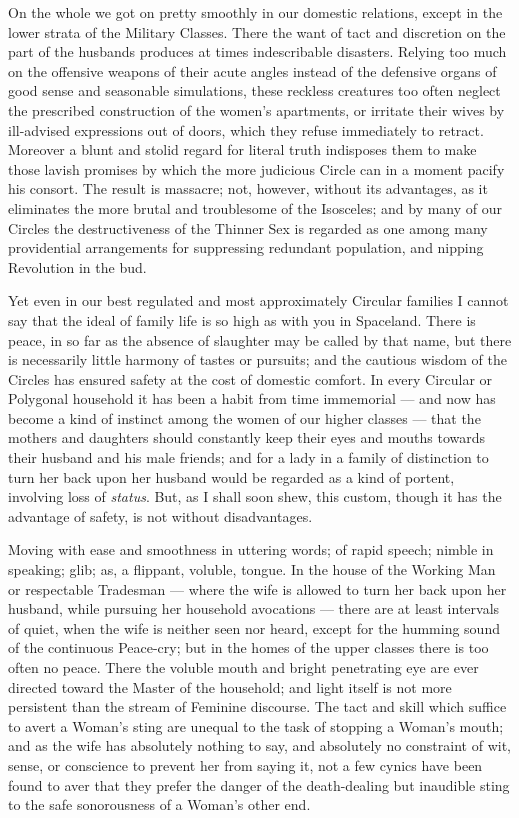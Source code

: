 \documentclass[10pt, kindle, oneside]{kindle}
\begin{document}
On the whole we got on pretty smoothly in our domestic
relations, except in the lower strata of the Military Classes. There the want
of tact and discretion on the part of the husbands produces at times
indescribable disasters. Relying too much on the offensive weapons of their
acute angles instead of the defensive organs of good sense and seasonable
simulations, these reckless creatures too often neglect the prescribed
construction of the women's apartments, or irritate their wives by ill-advised
expressions out of doors, which they refuse immediately to retract. Moreover a
blunt and stolid regard for literal truth indisposes them to make those lavish
promises by which the more judicious Circle can in a moment pacify his
consort. The result is massacre; not, however, without its advantages, as it
eliminates the more brutal and troublesome of the Isosceles; and by many of
our Circles the destructiveness of the Thinner Sex is regarded as one among
many providential arrangements for suppressing redundant population, and
nipping Revolution in the bud.

Yet even in our best regulated and most approximately Circular families I
cannot say that the ideal of family life is so high as with you in Spaceland.
There is peace, in so far as the absence of slaughter may be called by that
name, but there is necessarily little harmony of tastes or pursuits; and the
cautious wisdom of the Circles has ensured safety at the cost of domestic
comfort. In every Circular or Polygonal household it has been a habit from
time immemorial --- and now has become a kind of instinct among the women of our
higher classes --- that the mothers and daughters should constantly keep their
eyes and mouths towards their husband and his male friends; and for a lady in
a family of distinction to turn her back upon her husband would be regarded as
a kind of portent, involving loss of \emph{status}. But, as I shall soon shew, this
custom, though it has the advantage of safety, is not without disadvantages.

Moving with ease and smoothness in uttering words; of rapid speech;
nimble in speaking; glib; as, a flippant, voluble, tongue.  In the house of
the Working Man or respectable Tradesman --- where the wife is allowed to turn
her back upon her husband, while pursuing her household avocations --- there are
at least intervals of quiet, when the wife is neither seen nor heard, except
for the humming sound of the continuous Peace-cry; but in the homes of the
upper classes there is too often no peace. There the voluble mouth and bright
penetrating eye are ever directed toward the Master of the household; and
light itself is not more persistent than the stream of Feminine discourse. The
tact and skill which suffice to avert a Woman's sting are unequal to the task
of stopping a Woman's mouth; and as the wife has absolutely nothing to say,
and absolutely no constraint of wit, sense, or conscience to prevent her from
saying it, not a few cynics have been found to aver that they prefer the
danger of the death-dealing but inaudible sting to the safe sonorousness of a
Woman's other end.
\end{document}
